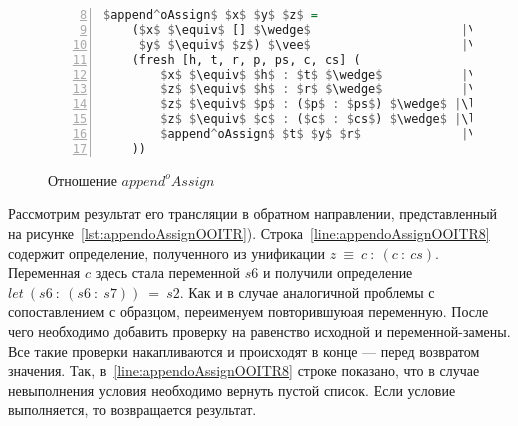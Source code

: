\begin{figure}[h!]
  \begin{center}
  \begin{minipage}{0.5\textwidth}
  \begin{lstlisting}[language=Haskell, frame=single, numbers=left,numberstyle=\small, firstnumber=8, escapechar=|]
  $append^oAssign$ $x$ $y$ $z$ =
    ($x$ $\equiv$ [] $\wedge$                     |\label{line:appendoAssign2}|
     $y$ $\equiv$ $z$) $\vee$                     |\label{line:appendoAssign3}|
    (fresh [h, t, r, p, ps, c, cs] (
        $x$ $\equiv$ $h$ : $t$ $\wedge$           |\label{line:appendoAssign5}|
        $z$ $\equiv$ $h$ : $r$ $\wedge$           |\label{line:appendoAssign6}|
        $z$ $\equiv$ $p$ : ($p$ : $ps$) $\wedge$ |\label{line:appendoAssign7}|
        $z$ $\equiv$ $c$ : ($c$ : $cs$) $\wedge$ |\label{line:appendoAssign8}|
        $append^oAssign$ $t$ $y$ $r$              |\label{line:appendoAssign9}|
    ))
    \end{lstlisting}
  \end{minipage}
  \end{center}
  \caption{Отношение $append^oAssign$}
  \label{lst:appendoAssign}
\end{figure}

Рассмотрим результат его трансляции в обратном направлении, представленный на рисунке~\ref{lst:appendoAssignOOITR}).
Строка~\ref{line:appendoAssignOOITR8} содержит определение, полученного из унификации $z~\equiv~c~:~(c~:~cs)$.
Переменная $c$ здесь стала переменной $s6$ и получили определение $let~(s6~:~(s6~:~s7))~=~s2$.
Как и в случае аналогичной проблемы с сопоставлением с образцом, переименуем повторившуюая переменную.
После чего необходимо добавить проверку на равенство исходной и переменной-замены.
Все такие проверки накапливаются и происходят в конце --- перед возвратом значения.
Так, в~\ref{line:appendoAssignOOITR8} строке показано, что в случае невыполнения условия необходимо вернуть пустой список.
Если условие выполняется, то возвращается результат.


